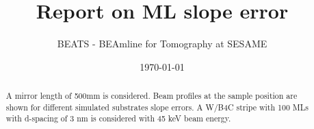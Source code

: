 \documentclass{sesamebeatsnote}
\title{Report on ML slope error}
\author{BEATS - BEAmline for Tomography at SESAME}
\date{\today}
\begin{document}
\maketitle

\begin{abstract}
A mirror length of 500mm is considered. Beam profiles at the sample position are shown for different simulated substrates slope errors. A W/B4C stripe with 100 MLs with d-spacing of 3 nm is considered with 45 keV beam energy. 
\end{abstract}

\vfill
\makereviewtable

\clearpage

\begingroup
\color{black}
\tableofcontents
\endgroup
\pagebreak

% 


%


% 
% 
\end{document}
